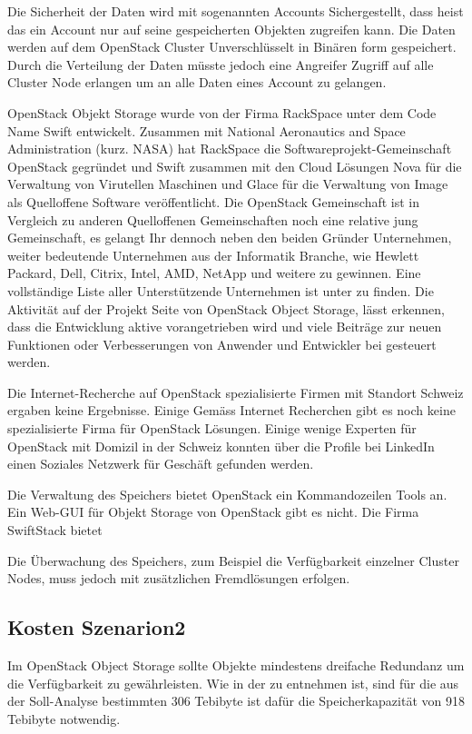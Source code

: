 Die Sicherheit der Daten wird mit sogenannten Accounts Sichergestellt, dass heist das ein Account nur auf seine gespeicherten Objekten zugreifen kann. Die Daten werden auf dem OpenStack Cluster Unverschlüsselt in Binären form gespeichert. Durch die Verteilung der Daten müsste jedoch eine Angreifer Zugriff auf alle Cluster Node erlangen um an alle Daten eines Account zu gelangen.

OpenStack Objekt Storage wurde von der Firma RackSpace unter dem Code Name Swift entwickelt. Zusammen mit National Aeronautics and Space Administration (kurz. NASA) hat RackSpace die Softwareprojekt-Gemeinschaft OpenStack gegründet und Swift zusammen mit den Cloud Lösungen Nova für die Verwaltung von Virutellen Maschinen und Glace für die Verwaltung von Image als Quelloffene Software veröffentlicht. Die OpenStack Gemeinschaft ist in Vergleich zu anderen Quelloffenen Gemeinschaften noch eine relative jung Gemeinschaft, es gelangt Ihr dennoch neben den beiden Gründer Unternehmen, weiter bedeutende Unternehmen aus der Informatik Branche, wie Hewlett Packard, Dell, Citrix, Intel, AMD, NetApp und weitere zu gewinnen. Eine vollständige Liste aller Unterstützende  Unternehmen ist unter  zu finden. Die Aktivität auf der Projekt Seite von OpenStack Object Storage, lässt erkennen, dass die Entwicklung aktive vorangetrieben wird und viele Beiträge zur neuen Funktionen oder Verbesserungen von Anwender und Entwickler bei gesteuert werden. \cite{Ohloh2012}

Die Internet-Recherche auf OpenStack spezialisierte Firmen mit Standort Schweiz ergaben keine Ergebnisse. Einige
Gemäss Internet Recherchen gibt es noch keine spezialisierte Firma für OpenStack Lösungen. Einige wenige Experten für OpenStack mit Domizil in der Schweiz konnten über die Profile bei LinkedIn einen Soziales Netzwerk für Geschäft gefunden werden. 

Die Verwaltung des Speichers bietet OpenStack ein Kommandozeilen Tools an. Ein Web-GUI für Objekt Storage von OpenStack gibt es nicht. Die Firma SwiftStack bietet  

Die Überwachung des Speichers, zum Beispiel die Verfügbarkeit einzelner Cluster Nodes, muss jedoch mit zusätzlichen Fremdlösungen erfolgen. 

\subsection{Kosten Szenarion2}

Im OpenStack Object Storage sollte Objekte mindestens dreifache Redundanz um die Verfügbarkeit zu gewährleisten. Wie in der  zu entnehmen ist, sind für die aus der Soll-Analyse bestimmten 306 Tebibyte ist dafür die Speicherkapazität von 918 Tebibyte notwendig.

